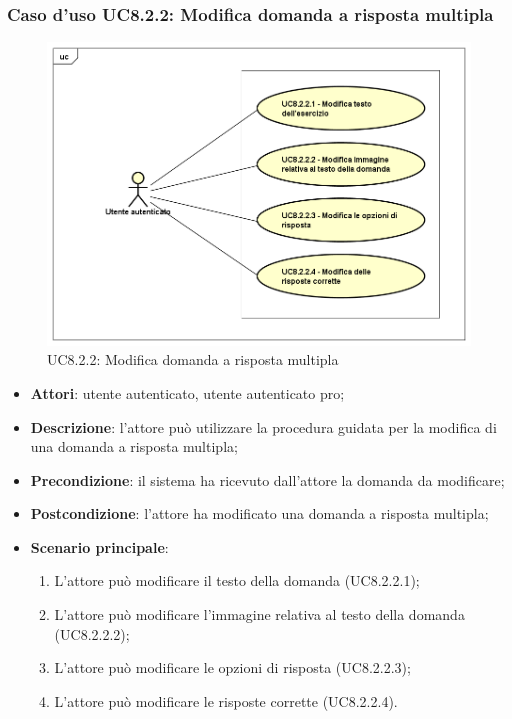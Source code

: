 \subsubsection{Caso d'uso UC8.2.2: Modifica domanda a risposta multipla}
	\label{UC8.2.2}
	\begin{figure}[ht]
		\centering
			\includegraphics[scale=0.45,keepaspectratio]{UML/UC8_2_2.png}
		\caption{UC8.2.2: Modifica domanda a risposta multipla}
	\end{figure}
	\FloatBarrier
	\begin{itemize}
		\item
			\textbf{Attori}: utente autenticato, utente autenticato pro;
		\item		
			\textbf{Descrizione}: l'attore può utilizzare la procedura guidata per la modifica di una domanda a risposta multipla;
		\item
			\textbf{Precondizione}: il sistema ha ricevuto dall'attore la domanda da modificare;
		\item
			\textbf{Postcondizione}: l'attore ha modificato una domanda a risposta multipla;
		\item
			\textbf{Scenario principale}:
	       		\begin{enumerate}
	       			\item
	       			L'attore può modificare il testo della domanda (UC8.2.2.1);
	       			\item
	       			L'attore può modificare l'immagine relativa al testo della domanda (UC8.2.2.2);
	       			\item
	       			L'attore può modificare le opzioni di risposta (UC8.2.2.3);
					\item
					L'attore può modificare le risposte corrette (UC8.2.2.4).
	 			\end{enumerate}
	\end{itemize}

